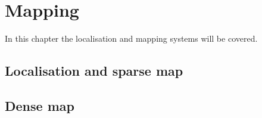 \chapter{Mapping} \label{chap:mapping}
In this chapter the localisation and mapping systems will be covered.

\section{Localisation and sparse map}

\section{Dense map}

